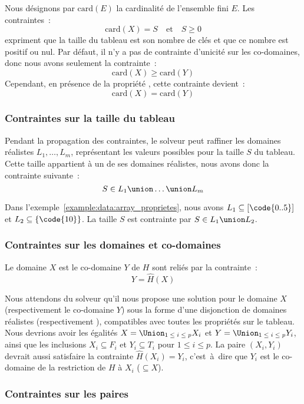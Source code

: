 Nous désignons par $\mathrm{card}(E)$ la cardinalité de l'ensemble fini $E$. Les
con\-train\-tes~:
%
$$\mathrm{card}(X) = S \quad\mathrm{et}\quad S \geq 0$$
%
expriment que la taille du tableau est son nombre de clés et que ce nombre est
positif ou nul. Par défaut, il n'y a pas de contrainte d'unicité sur les
co-domaines, donc nous avons seulement la contrainte~:
%
$$\mathrm{card}(X) \geq \mathrm{card}(Y)$$
%
Cependant, en présence de la propriété , cette contrainte
devient~:
%
$$\mathrm{card}(X) = \mathrm{card}(Y)$$

\subsubsection{Contraintes sur la taille du tableau}

Pendant la propagation des contraintes, le solveur peut raffiner les domaines
réalistes $L_1, \dots, L_m$, représentant les valeurs possibles pour la taille
$S$ du tableau. Cette taille appartient à un de ses domaines réalistes, nous
avons donc la contrainte suivante~:
%
$$S \in L_1 \union \dots \union L_m$$

Dans l'exemple~\ref{example:data:array_proprietes}, nous avons $L_1 \subseteq
[\code{0..5}]$ et $L_2 \subseteq \{\code{10}\}$. La taille $S$ est contrainte
par $S \in L_1 \union L_2$.

\subsubsection{Contraintes sur les domaines et co-domaines}

Le domaine $X$ est le co-domaine $Y$ de $H$ sont reliés par la contrainte~:
%
$$Y = \hat{H}(X)$$

Nous attendons du solveur qu'il nous propose une solution pour le domaine $X$
(respectivement le co-domaine $Y$) sous la forme d'une disjonction de domaines
réalistes  (respectivement ), compatibles avec toutes les propriétés sur le tableau. Nous
devrions avoir les égalités $X = \Union_{1 \;\leq\; i \;\leq\; p} X_i$ et $Y =
\Union_{1 \;\leq\; i \;\leq\; p} Y_i$, ainsi que les inclusions $X_i \subseteq
F_i$ et $Y_i \subseteq T_i$ pour $1 \leq i \leq p$. La paire $(X_i, Y_i)$
devrait aussi satisfaire la contrainte $\hat{H}(X_i) = Y_i$, c'est~à~dire que
$Y_i$ est le co-domaine de la restriction de $H$ à $X_i$ ($\subseteq X$).

\subsubsection{Contraintes sur les paires}

